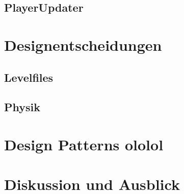\documentclass{llncs}
\begin{document}
\subsection{PlayerUpdater}


\section{Designentscheidungen}
\subsection{Levelfiles}
\subsection{Physik}


\section{Design Patterns ololol}



\section{Diskussion und Ausblick}
\end{document}
